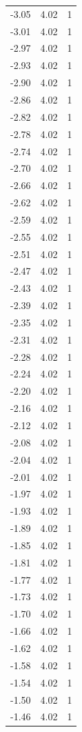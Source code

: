 \begin{longtable}{lrr}
  -3.05 & 4.02 & 1 \\
  -3.01 & 4.02 & 1 \\
  -2.97 & 4.02 & 1 \\
  -2.93 & 4.02 & 1 \\
  -2.90 & 4.02 & 1 \\
  -2.86 & 4.02 & 1 \\
  -2.82 & 4.02 & 1 \\
  -2.78 & 4.02 & 1 \\
  -2.74 & 4.02 & 1 \\
  -2.70 & 4.02 & 1 \\
  -2.66 & 4.02 & 1 \\
  -2.62 & 4.02 & 1 \\
  -2.59 & 4.02 & 1 \\
  -2.55 & 4.02 & 1 \\
  -2.51 & 4.02 & 1 \\
  -2.47 & 4.02 & 1 \\
  -2.43 & 4.02 & 1 \\
  -2.39 & 4.02 & 1 \\
  -2.35 & 4.02 & 1 \\
  -2.31 & 4.02 & 1 \\
  -2.28 & 4.02 & 1 \\
  -2.24 & 4.02 & 1 \\
  -2.20 & 4.02 & 1 \\
  -2.16 & 4.02 & 1 \\
  -2.12 & 4.02 & 1 \\
  -2.08 & 4.02 & 1 \\
  -2.04 & 4.02 & 1 \\
  -2.01 & 4.02 & 1 \\
  -1.97 & 4.02 & 1 \\
  -1.93 & 4.02 & 1 \\
  -1.89 & 4.02 & 1 \\
  -1.85 & 4.02 & 1 \\
  -1.81 & 4.02 & 1 \\
  -1.77 & 4.02 & 1 \\
  -1.73 & 4.02 & 1 \\
  -1.70 & 4.02 & 1 \\
  -1.66 & 4.02 & 1 \\
  -1.62 & 4.02 & 1 \\
  -1.58 & 4.02 & 1 \\
  -1.54 & 4.02 & 1 \\
  -1.50 & 4.02 & 1 \\
  -1.46 & 4.02 & 1 \\

\end{longtable}
